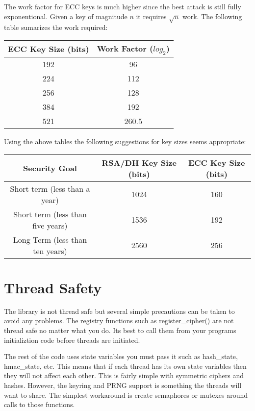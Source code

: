 \documentclass[a4paper]{book}
\begin{document}
The work factor for ECC keys is much higher since the best attack is still fully exponentional.  Given a key of magnitude
$n$ it requires $\sqrt n$ work.  The following table sumarizes the work required:
\begin{center}
\begin{tabular}{|c|c|}
    \hline ECC Key Size (bits) & Work Factor ($log_2$) \\
    \hline 192 & 96  \\
    \hline 224 & 112 \\
    \hline 256 & 128 \\
    \hline 384 & 192 \\
    \hline 521 & 260.5 \\
    \hline
\end{tabular}
\end{center}

Using the above tables the following suggestions for key sizes seems appropriate:
\begin{center}
\begin{tabular}{|c|c|c|}
    \hline Security Goal & RSA/DH Key Size (bits) & ECC Key Size (bits) \\
    \hline Short term (less than a year) & 1024 & 160 \\
    \hline Short term (less than five years) & 1536 & 192 \\
    \hline Long Term (less than ten years) & 2560 & 256 \\
    \hline 
\end{tabular}
\end{center}

\section{Thread Safety}
The library is not thread safe but several simple precautions can be taken to avoid any problems.  The registry functions
such as register\_cipher() are not thread safe no matter what you do.  Its best to call them from your programs initializtion
code before threads are initiated.

The rest of the code uses state variables you must pass it such as hash\_state, hmac\_state, etc.  This means that if each
thread has its own state variables then they will not affect each other.  This is fairly simple with symmetric ciphers
and hashes.  However, the keyring and PRNG support is something the threads will want to share.  The simplest workaround 
is create semaphores or mutexes around calls to those functions.  
\end{document}
